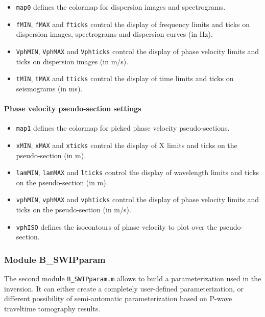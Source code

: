 \documentclass[twoside,a4paper]{article}
\begin{document}
\begin{itemize}[leftmargin=*]
\item \verb|map0| defines the colormap for dispersion images and spectrograms.

\item \verb|fMIN|, \verb|fMAX| and \verb|fticks| control the display of frequency limits and ticks on dispersion images, spectrograms and dispersion curves (in Hz).

\item \verb|VphMIN|, \verb|VphMAX| and \verb|Vphticks| control the display of phase velocity limits and ticks on dispersion images (in m/s).

\item \verb|tMIN|, \verb|tMAX| and \verb|tticks| control the display of time limits and ticks on seismograms (in ms).
\end{itemize}

\paragraph{Phase velocity pseudo-section settings}
\begin{itemize}[leftmargin=*]
\setlength\itemsep{2ex}
\item \verb|map1| defines the colormap for picked phase velocity pseudo-sections.

\item \verb|xMIN|, \verb|xMAX| and \verb|xticks| control the display of X limits and ticks on the pseudo-section (in m).

\item \verb|lamMIN|, \verb|lamMAX| and \verb|lticks| control the display of wavelength limits and ticks on the pseudo-section (in m).

\item \verb|vphMIN|, \verb|vphMAX| and \verb|vphticks| control the display of phase velocity limits and ticks on the pseudo-section (in m/s).

\item \verb|vphISO| defines the isocontours of phase velocity to plot over the pseudo-section.
\end{itemize}

\subsubsection{Module B\_SWIPparam}
The second module \verb|B_SWIPparam.m| allows to build a parameterization used in the inversion. It can either create a completely user-defined parameterization, or different possibility of semi-automatic parameterization based on P-wave traveltime tomography results.
\end{document}
